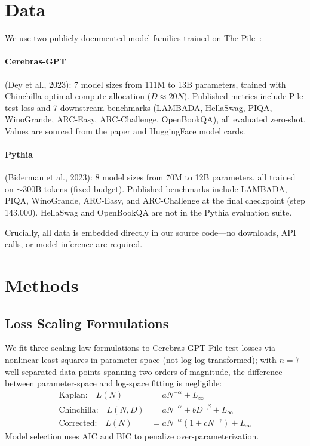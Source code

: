 \documentclass[11pt]{article}
\begin{document}
\section{Data}

We use two publicly documented model families trained on The Pile~\cite{gao2020pile}:

\paragraph{Cerebras-GPT} (Dey et al., 2023): 7 model sizes from 111M to 13B parameters, trained with Chinchilla-optimal compute allocation ($D \approx 20N$).
Published metrics include Pile test loss and 7 downstream benchmarks (LAMBADA, HellaSwag, PIQA, WinoGrande, ARC-Easy, ARC-Challenge, OpenBookQA), all evaluated zero-shot.
Values are sourced from the paper and HuggingFace model cards.

\paragraph{Pythia} (Biderman et al., 2023): 8 model sizes from 70M to 12B parameters, all trained on $\sim$300B tokens (fixed budget).
Published benchmarks include LAMBADA, PIQA, WinoGrande, ARC-Easy, and ARC-Challenge at the final checkpoint (step 143,000).
HellaSwag and OpenBookQA are not in the Pythia evaluation suite.

Crucially, all data is embedded directly in our source code---no downloads, API calls, or model inference are required.

\section{Methods}

\subsection{Loss Scaling Formulations}

We fit three scaling law formulations to Cerebras-GPT Pile test losses via nonlinear least squares in parameter space (not log-log transformed); with $n=7$ well-separated data points spanning two orders of magnitude, the difference between parameter-space and log-space fitting is negligible:
\begin{align}
  \text{Kaplan:} \quad L(N) &= a N^{-\alpha} + L_\infty \label{eq:kaplan} \\
  \text{Chinchilla:} \quad L(N,D) &= a N^{-\alpha} + b D^{-\beta} + L_\infty \label{eq:chinchilla} \\
  \text{Corrected:} \quad L(N) &= a N^{-\alpha}(1 + c N^{-\gamma}) + L_\infty \label{eq:corrected}
\end{align}
Model selection uses AIC and BIC to penalize over-parameterization.
\end{document}
